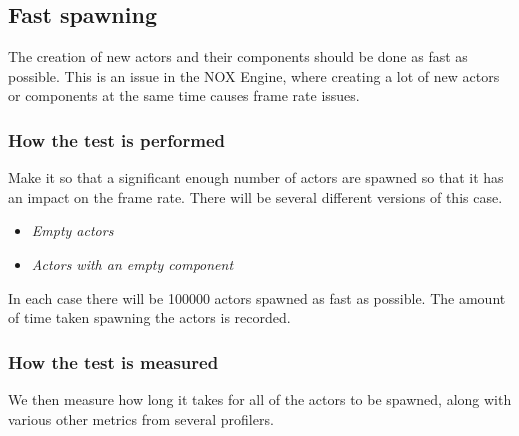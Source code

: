 \subsection{Fast spawning}
The creation of new actors and their components should be done as fast as possible.
This is an issue in the NOX Engine, where creating a lot of new actors or components at the same time causes frame rate issues.

\subsubsection*{How the test is performed}
Make it so that a significant enough number of actors are spawned so that it has an impact on the frame rate.
There will be several different versions of this case.

\begin{itemize}

    \item\noindent\textit{Empty actors}\\


    \item\noindent\textit{Actors with an empty component}\\

\end{itemize}

In each case there will be 100000 actors spawned as fast as possible.
The amount of time taken spawning the actors is recorded.


\subsubsection*{How the test is measured}
We then measure how long it takes for all of the actors to be spawned, along with various other metrics from several profilers.
